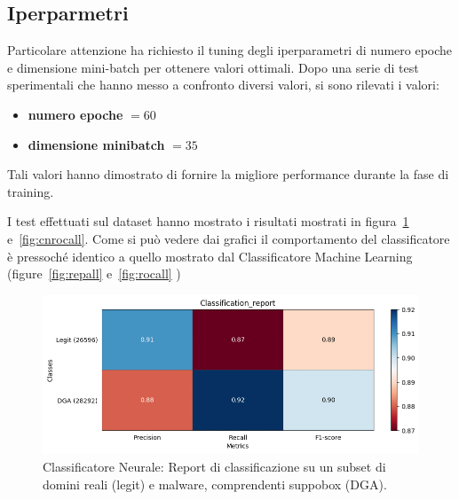 \newpage
\subsection{Iperparmetri}
Particolare attenzione ha richiesto il tuning degli iperparametri di numero epoche e dimensione mini-batch per ottenere valori ottimali. Dopo una serie di test sperimentali che hanno messo a confronto diversi valori, si sono rilevati i valori:

\begin{itemize}
\item \textbf{numero epoche} $= 60$
\item \textbf{dimensione minibatch} $= 35$ 
\end{itemize}

Tali valori hanno dimostrato di fornire la migliore performance durante la fase di training.

I test effettuati sul dataset hanno mostrato i risultati mostrati in figura~\ref{fig:cnrepall} e~\ref{fig:cnrocall}. Come si può vedere dai grafici il comportamento del classificatore è pressoché identico a quello mostrato dal Classificatore Machine Learning (figure~\ref{fig:repall} e~\ref{fig:rocall} )

\begin{figure}[!bp]
    \centering
    \includegraphics[width=\columnwidth]{figures/clas_nn/class_rep.png}
    \caption{Classificatore Neurale: Report di classificazione su un subset di domini reali (legit) e malware, comprendenti suppobox (DGA).\label{fig:cnrepall}}
\end{figure}

